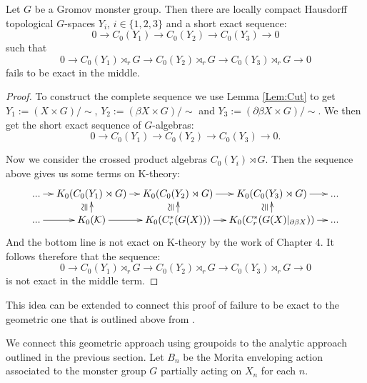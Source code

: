 \begin{example}
\begin{theorem}\label{Thm:GM1}
Let $G$ be a Gromov monster group. Then there are locally compact Hausdorff topological $G$-spaces $Y_{i}$, $i \in \lbrace 1,2,3 \rbrace$ and a short exact sequence:
\begin{equation*}
0 \rightarrow C_{0}(Y_{1}) \rightarrow C_{0}(Y_{2}) \rightarrow C_{0}(Y_{3}) \rightarrow 0
\end{equation*}
such that
\begin{equation*}
0 \rightarrow C_{0}(Y_{1})\rtimes_{r} G \rightarrow C_{0}(Y_{2})\rtimes_{r} G \rightarrow C_{0}(Y_{3})\rtimes_{r} G \rightarrow 0
\end{equation*}
fails to be exact in the middle.
\end{theorem}
\begin{proof}
To construct the complete sequence we use Lemma \ref{Lem:Cut} to get $Y_{1}:= (X \times G)/\sim$, $Y_{2}:= (\beta X \times G)/\sim$ and $Y_{3}:= (\partial\beta X \times G)/\sim$. We then get the short exact sequence of $G$-algebras:
\begin{equation*}
0 \rightarrow C_{0}(Y_{1}) \rightarrow C_{0}(Y_{2}) \rightarrow C_{0}(Y_{3}) \rightarrow 0.
\end{equation*}

Now we consider the crossed product algebras $C_{0}(Y_{i})\rtimes G$. Then the sequence above gives us some terms on K-theory: 
\begin{equation*}
\xymatrix@=1em{...\ar[r] & K_{0}(C_{0}(Y_{1})\rtimes G) \ar[r]& K_{0}(C_{0}(Y_{2})\rtimes G) \ar[r]& K_{0}(C_{0}(Y_{3})\rtimes G)\ar[r] & ...\\
...\ar[r] & K_{0}(\mathcal{K}) \ar[r]\ar[u]^{\ucong}& K_{0}(C^{*}_{r}(G(X))) \ar[r]\ar[u]^{\ucong}& K_{0}(C^{*}_{r}(G(X)|_{\partial\beta X})) \ar[r]\ar[u]^{\ucong}& ...}
\end{equation*}
And the bottom line is not exact on K-theory by the work of Chapter 4. It follows therefore that the sequence:
\begin{equation*}
0 \rightarrow C_{0}(Y_{1})\rtimes_{r} G \rightarrow C_{0}(Y_{2})\rtimes_{r} G \rightarrow C_{0}(Y_{3})\rtimes_{r} G \rightarrow 0
\end{equation*}
is not exact in the middle term.
\end{proof}

This idea can be extended to connect this proof of failure to be exact to the geometric one that is outlined above from \cite{higsonpreprint,explg1}. 

We connect this geometric approach using groupoids to the analytic approach outlined in the previous section. Let $B_{n}$ be the Morita enveloping action associated to the monster group $G$ partially acting on $X_{n}$ for each $n$.


\end{example}
